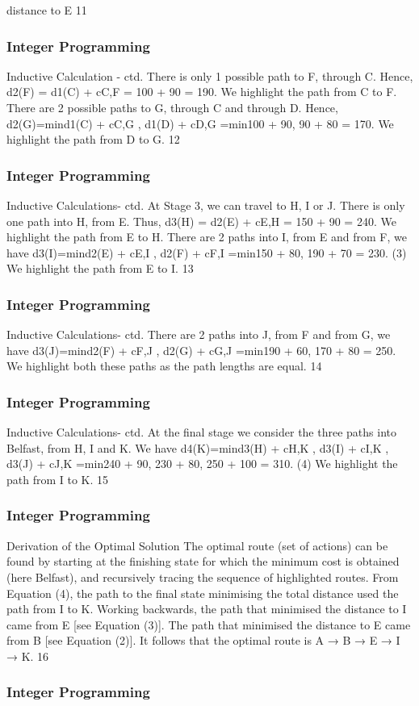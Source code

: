 \begin{frame}
distance to E
11 \end{frame}  \begin{frame} \frametitle{Integer Programming}     
Inductive Calculation - ctd.
There is only 1 possible path to F, through C. Hence,
d2(F) = d1(C) + cC,F = 100 + 90 = 190.
We highlight the path from C to F.
There are 2 possible paths to G, through C and through D. Hence,
d2(G)=min{d1(C) + cC,G , d1(D) + cD,G }
=min{100 + 90, 90 + 80} = 170.
We highlight the path from D to G.
12 \end{frame}  \begin{frame} \frametitle{Integer Programming}     
Inductive Calculations- ctd.
At Stage 3, we can travel to H, I or J. There is only one path into
H, from E. Thus,
d3(H) = d2(E) + cE,H = 150 + 90 = 240.
We highlight the path from E to H.
There are 2 paths into I, from E and from F, we have
d3(I)=min{d2(E) + cE,I
, d2(F) + cF,I }
=min{150 + 80, 190 + 70} = 230. (3)
We highlight the path from E to I.
13 \end{frame}  \begin{frame} \frametitle{Integer Programming}     
Inductive Calculations- ctd.
There are 2 paths into J, from F and from G, we have
d3(J)=min{d2(F) + cF,J , d2(G) + cG,J }
=min{190 + 60, 170 + 80} = 250.
We highlight both these paths as the path lengths are equal.
14 \end{frame}  \begin{frame} \frametitle{Integer Programming}     
Inductive Calculations- ctd.
At the final stage we consider the three paths into Belfast, from
H, I and K. We have
d4(K)=min{d3(H) + cH,K , d3(I) + cI,K , d3(J) + cJ,K }
=min{240 + 90, 230 + 80, 250 + 100} = 310. (4)
We highlight the path from I to K.
15 \end{frame}  \begin{frame} \frametitle{Integer Programming}     
Derivation of the Optimal Solution
The optimal route (set of actions) can be found by starting at the
finishing state for which the minimum cost is obtained (here
Belfast), and recursively tracing the sequence of highlighted routes.
From Equation (4), the path to the final state minimising the total
distance used the path from I to K.
Working backwards, the path that minimised the distance to I
came from E [see Equation (3)]. The path that minimised the
distance to E came from B [see Equation (2)]. It follows that the
optimal route is A → B → E → I → K.
16 \end{frame}  \begin{frame} \frametitle{Integer Programming}     

\end{frame}
